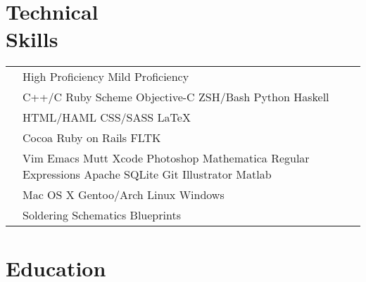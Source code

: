\documentclass[margin,line]{res}
\newenvironment{list1}{
    \begin{list}{\ding{113}}{%
      \setlength{\itemsep}{0in}
        \setlength{\parsep}{0in} \setlength{\parskip}{0in}
        \setlength{\topsep}{0in} \setlength{\partopsep}{0in} 
    \setlength{\leftmargin}{0.17in}}}{\end{list}}
\begin{document}
{\begin{resume}
{          \section{\sc Technical \\ Skills}} 
          \hspace{-.30in}
          {\renewcommand{\arraystretch}{.6}
            \renewcommand{\tabcolsep}{0.2cm}
            \begin{tabular}{@{}p{1.528in}p{5.8in}}
              & {\color{Black} High Proficiency} {\color{Black!20!White} Mild Proficiency}\\
              & {\color{Black}C++/C }  {\color{Black!80!White} Ruby }  {\color{Black!60!White} Scheme }  {\color{Black!40!White} Objective-C} {\color{Black!20!White} ZSH/Bash}  {\color{Black!20!White} Python } {\color{Black!10!White} Haskell}\\            
              & {\color{Black} HTML/HAML }  {\color{Black} CSS/SASS }  {\color{Black} \LaTeX{}}\\
              & {\color{Black} Cocoa}  {\color{Black!60!White} Ruby on Rails}  {\color{Black!20!White} FLTK }\\
              & {\color{Black} Vim }  {\color{Black} Emacs }  {\color{Black} Mutt} {\color{Black!60!White} Xcode }  {\color{Black!60!White} Photoshop }  {\color{Black!40!White} Mathematica }  {\color{Black!60!White} Regular Expressions } {\color{Black!60!White} Apache} {\color{Black!40!White} SQLite} {\color{Black!40!White} Git }  {\color{Black!20!White} Illustrator }  {\color{Black!20!White} Matlab }\\
              & {\color{Black} Mac OS X }  {\color{Black} Gentoo/Arch Linux }  {\color{Black!30!White} Windows }\\
              & {\color{Black} Soldering }  {\color{Black} Schematics}  {\color{Black!60!White} Blueprints}\\       
          \end{tabular}}

          {\color{WildStrawberry}
            \vspace{-.13in}
          \section{\sc Education}}


\end{resume}}
\end{document}
